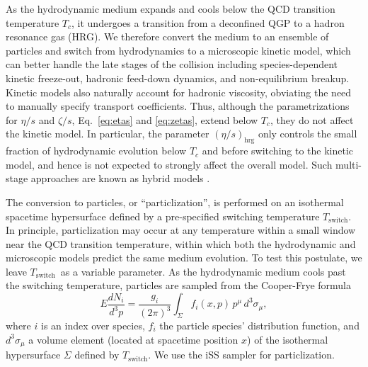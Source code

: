 \documentclass[aps,prc,reprint,amsmath,nofootinbib]{revtex4-1}
\begin{document}
As the hydrodynamic medium expands and cools below the QCD transition temperature $T_c$, it undergoes a transition from a deconfined QGP to a hadron resonance gas (HRG).
We therefore convert the medium to an ensemble of particles and switch from hydrodynamics to a microscopic kinetic model, which can better handle the late stages of the collision including species-dependent kinetic freeze-out, hadronic feed-down dynamics, and non-equilibrium breakup.
Kinetic models also naturally account for hadronic viscosity, obviating the need to manually specify transport coefficients.
Thus, although the parametrizations for $\eta/s$ and $\zeta/s$, Eq.~\eqref{eq:etas} and \eqref{eq:zetas}, extend below $T_c$, they do not affect the kinetic model.
In particular, the parameter $(\eta/s)_\text{hrg}$ only controls the small fraction of hydrodynamic evolution below $T_c$ and before switching to the kinetic model, and hence is not expected to strongly affect the overall model.
Such multi-stage approaches are known as hybrid models \cite{Bass:2000ib, Nonaka:2006yn, Petersen:2008dd}.

\newcommand{\Tsw}{$T_\text{switch}$}

The conversion to particles, or ``particlization'', is performed on an isothermal spacetime hypersurface defined by a pre-specified switching temperature \Tsw.
In principle, particlization may occur at any temperature within a small window near the QCD transition temperature, within which both the hydrodynamic and microscopic models predict the same medium evolution.
To test this postulate, we leave \Tsw\ as a variable parameter.
As the hydrodynamic medium cools past the switching temperature, particles are sampled from the Cooper-Frye formula \cite{Cooper:1974mv}
\begin{equation}
  E \frac{dN_i}{d^3p} =
    \frac{g_i}{(2\pi)^3} \int_\Sigma f_i(x,p) \, p^\mu \, d^3\sigma_\mu,
  \label{eq:cooper_frye}
\end{equation}
where $i$ is an index over species, $f_i$ the particle species' distribution function, and $d^3\sigma_\mu$ a volume element (located at spacetime position $x$) of the isothermal hypersurface $\Sigma$ defined by \Tsw.
We use the iSS sampler \cite{Shen:2014vra, Qiu:2013wca} for particlization.

\newcommand{\df}{\delta f}
\end{document}

